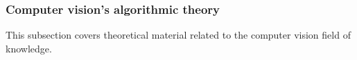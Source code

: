 \documentclass[../../../../main]{subfiles}
\begin{document}
\subsubsection{Computer vision's algorithmic theory}

This subsection covers theoretical material related to the computer vision field of knowledge.


\newpage


\newpage


\newpage


\newpage
\end{document}
